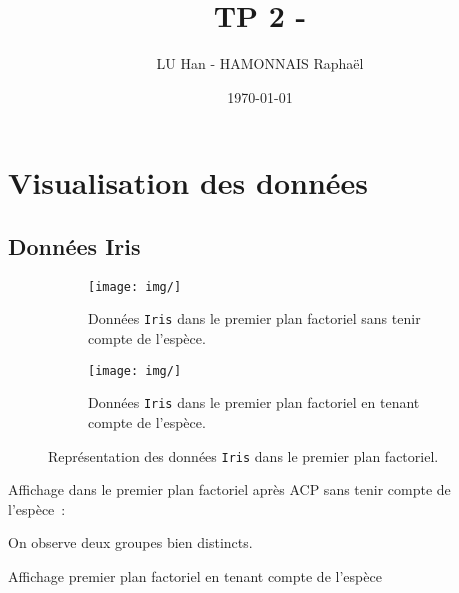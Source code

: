 \documentclass[a4paper,10pt]{report}
\title{TP 2 - }
\author{LU Han - HAMONNAIS Raphaël}
\date{\today}
\begin{document}
\renewcommand{\labelitemi}{\large\textcolor{tatoebagreen}{\fg}}
\groovypdtitre
\restoregeometry %


\tableofcontents




\chapter{Visualisation des données}

\section{Données Iris}

\begin{figure}[H]

\end{figure}


\begin{figure}[H]
	\centering
	\captionsetup{justification=centering, margin=2cm}
	\begin{subfigure}[b]{0.5\linewidth}
		\centering
		\captionsetup{justification=centering, margin=2cm}
		\texttt{[image: img/]}
		\caption{\scriptsize Données \texttt{Iris} dans le premier plan factoriel sans tenir compte de l'espèce.}
		\label{fig:}
	\end{subfigure}%
	\begin{subfigure}[b]{0.5\linewidth}
		\centering
		\captionsetup{justification=centering, margin=2cm}
		\texttt{[image: img/]}
		\caption{\scriptsize Données \texttt{Iris} dans le premier plan factoriel en tenant compte de l'espèce.}
		\label{fig:}
	\end{subfigure}%
	\caption{
		\scriptsize Représentation des données \texttt{Iris} dans le premier plan factoriel.
	}
	\label{fig:tab_effectifs_et_contingence_resultats_diplome_origine}%
\end{figure}

Affichage dans le premier plan factoriel après ACP sans tenir compte de l'espèce~:

On observe deux groupes bien distincts.

Affichage premier plan factoriel en tenant compte de l'espèce
\end{document}
